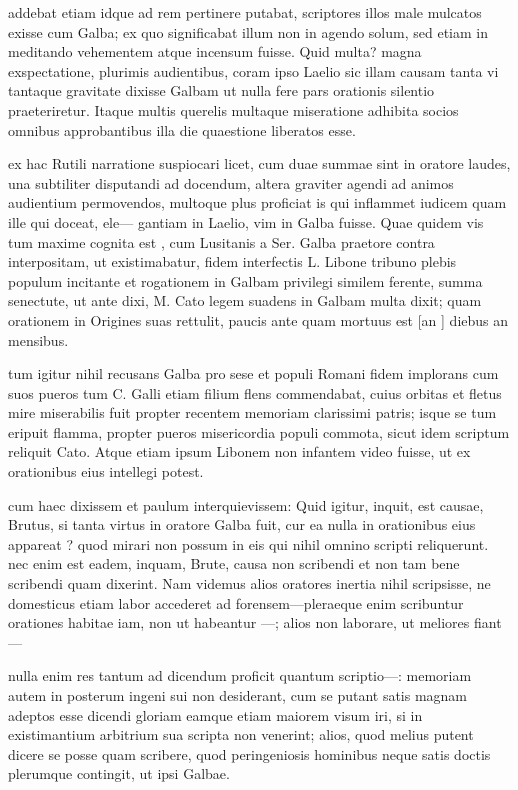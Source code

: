  addebat etiam idque ad rem pertinere putabat, scriptores illos male mulcatos exisse cum Galba; ex quo significabat illum non in agendo solum, sed etiam in meditando vehementem atque incensum fuisse. Quid multa? magna exspectatione, plurimis audientibus, coram ipso Laelio sic illam causam tanta vi tantaque gravitate dixisse Galbam ut nulla fere pars orationis silentio praeteriretur. Itaque multis querelis multaque miseratione adhibita socios omnibus approbantibus illa die quaestione liberatos esse.

 ex hac Rutili narratione suspiocari licet, cum duae summae sint in oratore laudes, una subtiliter disputandi ad docendum, altera graviter agendi ad animos audientium permovendos, multoque plus proficiat is qui inflammet iudicem quam ille qui doceat, ele— gantiam in Laelio, vim in Galba fuisse. Quae quidem vis tum maxime cognita est , cum Lusitanis a Ser. Galba praetore contra interpositam, ut existimabatur, fidem interfectis L. Libone tribuno plebis populum incitante et rogationem in Galbam privilegi similem ferente, summa senectute, ut ante dixi, M. Cato legem suadens in Galbam multa dixit; quam orationem in Origines suas rettulit, paucis ante quam mortuus est [an ] diebus an mensibus.

 tum igitur nihil recusans Galba pro sese et populi Romani fidem implorans cum suos pueros tum C. Galli etiam filium flens commendabat, cuius orbitas et fletus mire miserabilis fuit propter recentem memoriam clarissimi patris; isque se tum eripuit flamma, propter pueros misericordia populi commota, sicut idem scriptum reliquit Cato. Atque etiam ipsum Libonem non infantem video fuisse, ut ex orationibus eius intellegi potest.

 cum haec dixissem et paulum interquievissem: Quid igitur, inquit, est causae, Brutus, si tanta virtus in oratore Galba fuit, cur ea nulla in orationibus eius appareat ? quod mirari non possum in eis qui nihil omnino scripti reliquerunt. nec enim est eadem, inquam, Brute, causa non scribendi et non tam bene scribendi quam dixerint. Nam videmus alios oratores inertia nihil scripsisse, ne domesticus etiam labor accederet ad forensem—pleraeque enim scribuntur orationes habitae iam, non ut habeantur —; alios non laborare, ut meliores fiant—

 nulla enim res tantum ad dicendum proficit quantum scriptio—: memoriam autem in posterum ingeni sui non desiderant, cum se putant satis magnam adeptos esse dicendi gloriam eamque etiam maiorem visum iri, si in existimantium arbitrium sua scripta non venerint; alios, quod melius putent dicere se posse quam scribere, quod peringeniosis hominibus neque satis doctis plerumque contingit, ut ipsi Galbae.

